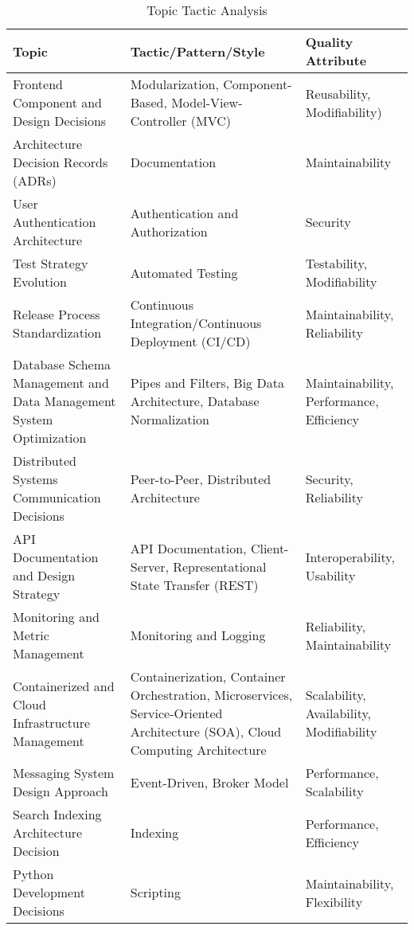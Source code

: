 {\small
    \begin{longtable}{|p{5cm}p{6cm}p{3cm}|}
        \caption{Topic Tactic Analysis}
        \label{table:topic_tactic}
        \hline
        \textbf{Topic} & \textbf{Tactic/Pattern/Style} & \textbf{Quality Attribute} \\
        \hline
        \endfirsthead
        
        \hline
        \endfoot
        
        \endlastfoot
        
        Frontend Component and Design Decisions & Modularization, Component-Based, Model-View-Controller (MVC) & Reusability, Modifiability) \\
        Architecture Decision Records (ADRs) & Documentation & Maintainability \\
        User Authentication Architecture & Authentication and Authorization & Security \\
        Test Strategy Evolution & Automated Testing & Testability, Modifiability \\
        Release Process Standardization & Continuous Integration/Continuous Deployment (CI/CD) & Maintainability, Reliability \\
        Database Schema Management and Data Management System Optimization & Pipes and Filters, Big Data Architecture, Database Normalization & Maintainability, Performance, Efficiency \\
        Distributed Systems Communication Decisions & Peer-to-Peer, Distributed Architecture & Security, Reliability \\
        API Documentation and Design Strategy & API Documentation, Client-Server, Representational State Transfer (REST) & Interoperability, Usability \\
        Monitoring and Metric Management & Monitoring and Logging & Reliability, Maintainability \\
        Containerized and Cloud Infrastructure Management & Containerization, Container Orchestration, Microservices, Service-Oriented Architecture (SOA), Cloud Computing Architecture & Scalability, Availability, Modifiability \\
        Messaging System Design Approach & Event-Driven, Broker Model & Performance, Scalability \\
        Search Indexing Architecture Decision & Indexing & Performance, Efficiency \\
        Python Development Decisions & Scripting & Maintainability, Flexibility \\

\end{longtable}}
